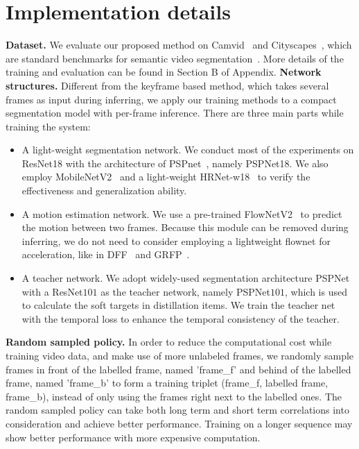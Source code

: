 \documentclass[runningheads]{llncs}
\begin{document}
\section{Implementation details}
\noindent\textbf{Dataset.} We evaluate our proposed method on Camvid~\cite{brostow2008segmentation} and Cityscapes~\cite{Cordts2016Cityscapes}, which are standard benchmarks for semantic video segmentation~\cite{jain2019accel,shelhamer2016clockwork,nilsson2018semantic}. More details of the training and evaluation can be found in Section B of Appendix.
\noindent\textbf{Network structures.}
Different from the keyframe based method, which takes several frames as input during inferring, we apply our training methods to a compact segmentation model with per-frame inference. There are three main parts while training the system:
\begin{itemize}
    \setlength{\itemsep}{0pt}
    \setlength{\parskip}{0pt}
    \setlength{\parsep}{0pt}
    \item A light-weight segmentation network. We conduct most of the experiments on ResNet18 with the architecture of PSPnet~\cite{zhao2017pyramid}, namely PSPNet18. We also employ MobileNetV2~\cite{Sandler2018MobileNetV2IR} and a light-weight HRNet-w18~\cite{SunZJCXLMWLW19} to verify the effectiveness and
generalization ability.
    \item A motion estimation network. We use a pre-trained FlowNetV2~\cite{flownet2-pytorch} to predict the motion between two frames. Because this module can be removed during inferring, we do not need to consider employing a lightweight flownet for acceleration, like in DFF~\cite{zhu2017deep} and GRFP~\cite{nilsson2018semantic}.

    \item A teacher network. We adopt widely-used segmentation architecture PSPNet \cite{zhao2017pyramid} with a ResNet$101$ \cite{He2016DeepRL} as the teacher network, namely PSPNet$101$, which is used to calculate the soft targets in distillation items. We train the teacher net with the temporal loss to enhance the temporal consistency of the teacher.

\end{itemize}


\noindent\textbf{Random sampled policy.}
In order to reduce the computational cost while training video data, and make use of more unlabeled frames, we randomly sample frames in front of the labelled frame, named 'frame\_f' and behind of the labelled frame, named 'frame\_b' to form a training triplet (frame\_f, labelled frame, frame\_b), instead of only using the frames right next to the labelled ones. The random sampled policy can take both long term and short term correlations into consideration and achieve better performance. Training on a longer sequence may
show
better performance with
more expensive computation.
\end{document}
